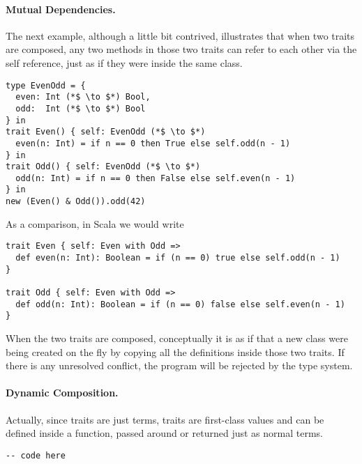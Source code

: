\paragraph{Mutual Dependencies.}
The next example, although a little bit contrived, illustrates that when two
traits are composed, any two methods in those two traits can refer to each
other via the self reference, just as if they were inside the same class.

\begin{lstlisting}
type EvenOdd = {
  even: Int (*$ \to $*) Bool,
  odd:  Int (*$ \to $*) Bool
} in
trait Even() { self: EvenOdd (*$ \to $*)
  even(n: Int) = if n == 0 then True else self.odd(n - 1)
} in
trait Odd() { self: EvenOdd (*$ \to $*)
  odd(n: Int) = if n == 0 then False else self.even(n - 1)
} in
new (Even() & Odd()).odd(42)
\end{lstlisting}

As a comparison, in Scala we would write

\begin{lstlisting}
trait Even { self: Even with Odd =>
  def even(n: Int): Boolean = if (n == 0) true else self.odd(n - 1)
}

trait Odd { self: Even with Odd =>
  def odd(n: Int): Boolean = if (n == 0) false else self.even(n - 1)
}
\end{lstlisting}

When the two traits are composed, conceptually it is as if that a new class were
being created on the fly by copying all the definitions inside those two traits.
If there is any unresolved conflict, the program will be rejected by the type
system.

\paragraph{Dynamic Composition.}

Actually, since traits are just terms, traits are first-class values and can be
defined inside a function, passed around or returned just as normal terms.

\begin{lstlisting}
-- code here
\end{lstlisting}

